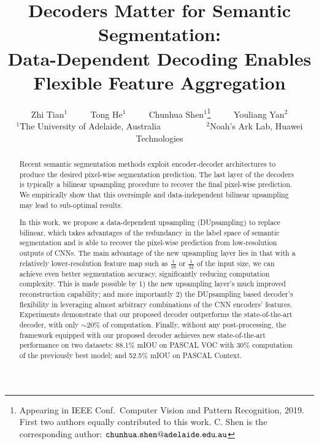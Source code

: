 \documentclass[10pt,twocolumn,letterpaper]{article}
\newcommand{\1}{{\mathbbm{1}}}
\begin{document}
\title{Decoders Matter for Semantic Segmentation: \\
Data-Dependent Decoding Enables Flexible Feature Aggregation
}



\author{Zhi Tian$ ^1$
        ~~~~ Tong He$ ^1$
        ~~~~ Chunhua Shen$ ^{1}$\thanks{Appearing in IEEE Conf.\
        Computer Vision and Pattern Recognition, 2019.
        First two authors equally contributed to this work. C. Shen is the corresponding author: $\tt chunhua.shen@adelaide.edu.au$}
~~~~ Youliang Yan$ ^2 $
\\
$ ^1$The University of Adelaide, Australia ~ ~ ~ ~ ~ ~ $ ^2$Noah's Ark Lab, Huawei Technologies
}





\maketitle
\thispagestyle{empty}

\begin{abstract}


Recent semantic segmentation methods exploit encoder-decoder architectures to produce the desired pixel-wise segmentation prediction. The last layer of the decoders is typically a bilinear upsampling procedure to recover the final pixel-wise prediction. We empirically show that this oversimple and data-independent bilinear upsampling may lead to sub-optimal results.



In this work, we propose a data-dependent upsampling (DUpsampling) to replace  bilinear, which takes advantages of the redundancy in the label space of semantic segmentation and is able to recover the pixel-wise prediction from low-resolution outputs of CNNs.
The main advantage of the new upsampling layer lies in that with a relatively lower-resolution feature map such as $\frac{1}{16}$ or $\frac{1}{32}$ of the input size, we can achieve even better segmentation accuracy, significantly reducing computation complexity. This is made possible by 1) the new upsampling layer's much improved reconstruction capability; and more importantly 2) the DUpsampling based decoder's flexibility in leveraging almost arbitrary  combinations of the CNN encoders' features. Experiments demonstrate that our proposed decoder outperforms the state-of-the-art decoder, with only $\sim$20\% of computation. Finally, without any post-processing, the framework equipped with our proposed decoder achieves new state-of-the-art performance on two datasets: 88.1\% mIOU on PASCAL VOC with 30\% computation of the previously best model; and 52.5\% mIOU on PASCAL Context.

\end{abstract}
\end{document}

